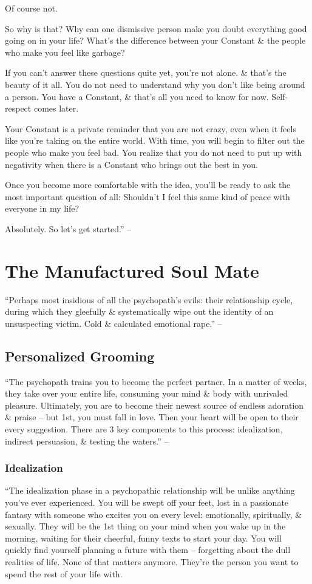 \documentclass{article}
\numberwithin{equation}{section}
\begin{document}
Of course not.

So why is that? Why can one dismissive person make you doubt everything good going on in your life? What's the difference between your Constant \& the people who make you feel like garbage?

If you can't answer these questions quite yet, you're not alone. \& that's the beauty of it all. You do not need to understand why you don't like being around a person. You have a Constant, \& that's all you need to know for now. Self-respect comes later.

Your Constant is a private reminder that you are not crazy, even when it feels like you're taking on the entire world. With time, you will begin to filter out the people who make you feel bad. You realize that you do not need to put up with negativity when there is a Constant who brings out the best in you.

Once you become more comfortable with the idea, you'll be ready to ask the most important question of all: Shouldn't I feel this same kind of peace with everyone in my life?

Absolutely. So let's get started.'' -- \cite[pp. 19--22]{MacKenzie2015}


\section{The Manufactured Soul Mate}
``Perhaps most insidious of all the psychopath's evils: their relationship cycle, during which they gleefully \& systematically wipe out the identity of an unsuspecting victim. Cold \& calculated emotional rape.'' -- \cite[p. 23]{MacKenzie2015}

\subsection{Personalized Grooming}
``The psychopath trains you to become the perfect partner. In a matter of weeks, they take over your entire life, consuming your mind \& body with unrivaled pleasure. Ultimately, you are to become their newest source of endless adoration \& praise -- but 1st, you must fall in love. Then your heart will be open to their every suggestion. There are 3 key components to this process: idealization, indirect persuasion, \& testing the waters.'' -- \cite[p. 24]{MacKenzie2015}

\subsubsection{Idealization}
``The idealization phase in a psychopathic relationship will be unlike anything you've ever experienced. You will be swept off your feet, lost in a passionate fantasy with someone who excites you on every level: emotionally, spiritually, \& sexually. They will be the 1st thing on your mind when you wake up in the morning, waiting for their cheerful, funny texts to start your day. You will quickly find yourself planning a future with them -- forgetting about the dull realities of life. None of that matters anymore. They're the person you want to spend the rest of your life with.
\end{document}
